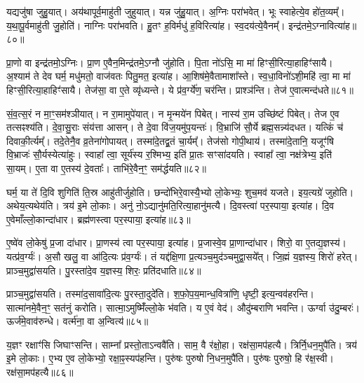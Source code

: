 यद्यजु॑षा जुहु॒यात्। 
अय॑थापूर्व॒माहु॑ती जुहुयात्। 
यन्न जु॑हु॒यात्। 
अ॒ग्निः परा॑भवेत्। 
भूः स्वाहेत्ये॒व हो॑त॒व्यम्᳚। 
य॒था॒पू॒र्वमाहु॑ती जु॒होति॑। 
नाग्निः परा॑भवति। 
हु॒तꣳ ह॒विर्मधु॑ ह॒विरित्या॑ह। 
स्व॒दय॑त्ये॒वैनम्᳚। 
इन्द्र॑तमे॒ऽग्नावित्या॑ह॥८०॥

प्रा॒णो वा इन्द्र॑तमो॒ऽग्निः। 
प्रा॒ण ए॒वैन॒मिन्द्र॑तमे॒ऽग्नौ जु॑होति। 
पि॒ता नो॑ऽसि॒ मा मा॑ हिꣳसी॒रित्या॒हाहिꣳ॑सायै। 
अ॒श्याम॑ ते देव घर्म॒ मधु॑मतो॒ वाज॑वतः पितु॒मत॒ इत्या॑ह। 
आ॒शिष॑मे॒वैतामाशा᳚स्ते। 
स्व॒धा॒विनो॑ऽशी॒महि॑ त्वा॒ मा मा॑ हिꣳसी॒रित्या॒हाहिꣳ॑सायै। 
तेज॑सा॒ वा ए॒ते व्यृ॑ध्यन्ते। 
ये प्र॑व॒र्ग्ये॑ण॒ चर॑न्ति। 
प्राश्ञ॑न्ति। 
तेज॑ ए॒वात्मन्द॑धते॥८१॥

सं॒व॒त्स॒रं न मा॒ꣳ॒सम॑श्ञीयात्। 
न रा॒मामुपे॑यात्। 
न मृ॒न्मये॑न पिबेत्। 
नास्य॑ रा॒म उच्छि॑ष्टं पिबेत्। 
तेज ए॒व तत्सꣴश्य॑ति। 
दे॒वा॒सु॒राः संय॑त्ता आसन्। 
ते दे॒वा वि॑ज॒यमु॑प॒यन्तः॑। 
वि॒भ्राजि॑ सौ॒र्ये ब्रह्म॒सन्न्य॑दधत। 
यत्किं च॑ दिवाकी॒र्त्यम्᳚। 
तदे॒तेनै॒व व्र॒तेना॑गोपायत्। 
तस्मा॑दे॒तद्व्र॒तं चा॒र्यम्᳚। 
तेज॑सो गोपी॒थाय॑। 
तस्मा॑दे॒तानि॒ यजूꣳ॑षि वि॒भ्राजः॑ सौ॒र्यस्येत्या॑हुः। 
स्वाहा᳚ त्वा॒ सूर्य॑स्य र॒श्मिभ्य॒ इति॑ प्रा॒तः सꣳसा॑दयति। 
स्वाहा᳚ त्वा॒ नक्ष॑त्रेभ्य॒ इति॑ सा॒यम्। 
ए॒ता वा ए॒तस्य॑ दे॒वताः᳚। 
ताभि॑रे॒वैन॒ꣳ॒ सम॑र्द्धयति॥८२॥

घर्म॒ या ते॑ दि॒वि शुगिति॑ ति॒स्र आहु॑तीर्जुहोति। 
छन्दो॑भिरे॒वास्यै॒भ्यो लो॒केभ्यः॒ शुच॒मव॑ यजते। 
इय॒त्यग्रे॑ जुहोति। 
अथेय॒त्यथेय॑ति। 
त्रय॑ इ॒मे लो॒काः। 
अनु॑ नो॒ऽद्यानु॑\-मति॒रित्या॒हानु॑मत्यै। 
दि॒वस्त्वा॑ पर॒स्पाया॒ इत्या॑ह। 
दि॒व ए॒वेमाँल्लो॒कान्दा॑धार। 
ब्रह्म॑णस्त्वा पर॒स्पाया॒ इत्या॑ह॥८३॥

ए॒ष्वे॑व लो॒केषु॑ प्र॒जा दा॑धार। 
प्रा॒णस्य॑ त्वा पर॒स्पाया॒ इत्या॑ह। 
प्र॒जास्वे॒व प्रा॒णान्दा॑धार। 
शिरो॒ वा ए॒तद्य॒ज्ञस्य॑। 
यत्प्र॑व॒र्ग्यः॑। 
अ॒सौ खलु॒ वा आ॑दि॒त्यः प्र॑व॒र्ग्यः॑। 
तं यद्द॑क्षि॒णा प्र॒त्यञ्च॒मुद॑ञ्चमुद्वा॒सये᳚त्। 
जि॒ह्मं य॒ज्ञस्य॒ शिरो॑ हरेत्। 
प्राञ्च॒मुद्वा॑सयति। 
पु॒रस्ता॑दे॒व य॒ज्ञस्य॒ शिरः॒ प्रति॑दधाति॥८४॥

प्राञ्च॒मुद्वा॑सयति। 
तस्मा॑द॒सावा॑दि॒त्यः पु॒रस्ता॒दुदे॑ति। 
श॒फो॒प॒य॒\-मान्ध॒वित्रा॑णि॒ धृष्टी॒ इत्य॒न्वव॑हरन्ति। 
सात्मा॑नमे॒वैन॒ꣳ॒ सत॑नुं करोति। 
सात्मा॒ऽमुष्मिँ॑ल्लो॒के भ॑वति। 
य ए॒वं वेद॑। 
औदु॑म्बराणि भवन्ति। 
ऊर्ग्वा उ॑दु॒म्बरः॑। 
ऊर्ज॑मे॒वाव॑रुन्धे। 
वर्त्म॑ना॒ वा अ॒न्वित्य॑॥८५॥

य॒ज्ञꣳ रक्षाꣳ॑सि जिघाꣳसन्ति। 
साम्ना᳚ प्रस्तो॒ताऽन्ववै॑ति। 
साम॒ वै र॑क्षो॒हा। 
रक्ष॑सा॒मप॑हत्यै। 
त्रिर्नि॒धन॒मुपै॑ति। 
त्रय॑ इ॒मे लो॒काः। 
ए॒भ्य ए॒व लो॒केभ्यो॒ रक्षा॒ꣴ॒स्यप॑हन्ति। 
पुरु॑षः पुरुषो नि॒धन॒मुपै॑ति। 
पुरु॑षः पुरुषो॒ हि र॑क्ष॒स्वी। 
रक्ष॑सा॒मप॑हत्यै॥८६॥

